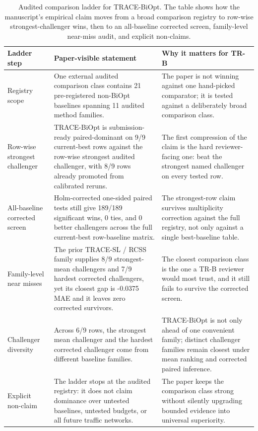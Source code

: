 \begin{table}[pos=htbp]
\centering
\caption{Audited comparison ladder for TRACE-BiOpt. The table shows how the manuscript's empirical claim moves from a broad comparison registry to row-wise strongest-challenger wins, then to an all-baseline corrected screen, family-level near-miss audit, and explicit non-claims.}
\label{tab:trace-biopt-comparison-ladder}
\small
\begin{tabularx}{\textwidth}{>{\raggedright\arraybackslash}p{}>{\raggedright\arraybackslash}p{}>{\raggedright\arraybackslash}X}
\toprule
Ladder step & Paper-visible statement & Why it matters for TR-B \\
\midrule
Registry scope & One external audited comparison class contains 21 pre-registered non-BiOpt baselines spanning 11 audited method families. & The paper is not winning against one hand-picked comparator; it is tested against a deliberately broad comparison class. \\
Row-wise strongest challenger & TRACE-BiOpt is submission-ready paired-dominant on 9/9 current-best rows against the row-wise strongest audited challenger, with 8/9 rows already promoted from calibrated reruns. & The first compression of the claim is the hard reviewer-facing one: beat the strongest named challenger on every tested row. \\
All-baseline corrected screen & Holm-corrected one-sided paired tests still give 189/189 significant wins, 0 ties, and 0 better challengers across the full current-best row-baseline matrix. & The strongest-row claim survives multiplicity correction against the full registry, not only against a single best-baseline table. \\
Family-level near misses & The prior TRACE-SL / RCSS family supplies 8/9 strongest-mean challengers and 7/9 hardest corrected challengers, yet its closest gap is -0.0375 MAE and it leaves zero corrected survivors. & The closest comparison class is the one a TR-B reviewer would most trust, and it still fails to survive the corrected screen. \\
Challenger diversity & Across 6/9 rows, the strongest mean challenger and the hardest corrected challenger come from different baseline families. & TRACE-BiOpt is not only ahead of one convenient family; distinct challenger families remain closest under mean ranking and corrected paired inference. \\
Explicit non-claim & The ladder stops at the audited registry: it does not claim dominance over untested baselines, untested budgets, or all future traffic networks. & The paper keeps the comparison class strong without silently upgrading bounded evidence into universal superiority. \\
\bottomrule
\end{tabularx}
\end{table}
